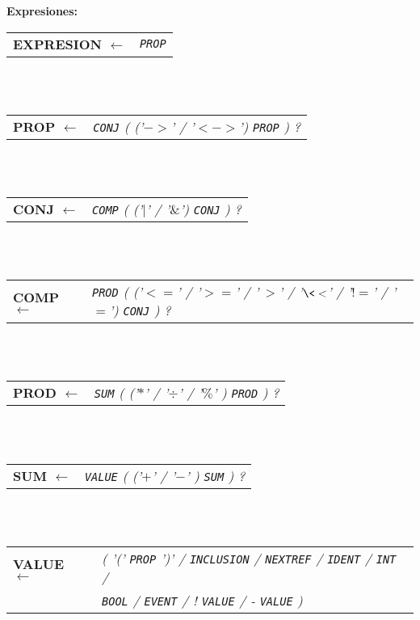 \documentclass[titlepage, 12pt]{book}
\begin{document}
\textbf{Expresiones:}\\

\noindent \begin{tabular}{>{\bfseries}l>{\itshape}l}
EXPRESION $\longleftarrow$ & \verb|PROP|
\end{tabular}
~\\\\
\begin{tabular}{>{\bfseries}l>{\itshape}l}
PROP $\longleftarrow$ & \verb|CONJ| ( ('$->$' / '$<->$') \verb|PROP| ) ?
\end{tabular}
~\\\\
\begin{tabular}{>{\bfseries}l>{\itshape}l}
CONJ $\longleftarrow$ & \verb|COMP| ( ('$|$' / '$\&$') \verb|CONJ| ) ?
\end{tabular}
~\\\\
\begin{tabular}{>{\bfseries}l>{\itshape}l}
COMP $\longleftarrow$ & \verb|PROD| ( ('$<=$' / '$>=$' / '$\>>$' / '$\<<$' / '$!=$' / '$=$') \verb|CONJ| ) ?
\end{tabular}
~\\\\
\begin{tabular}{>{\bfseries}l>{\itshape}l}
PROD $\longleftarrow$ & \verb|SUM| ( ('$*$' / '$\div$' / '$\%$' ) \verb|PROD| ) ?
\end{tabular}
~\\\\
\begin{tabular}{>{\bfseries}l>{\itshape}l}
SUM $\longleftarrow$ & \verb|VALUE| ( ('$+$' / '$-$' ) \verb|SUM| ) ?
\end{tabular}
~\\\\
\begin{tabular}{>{\bfseries}l>{\itshape}l}
VALUE $\longleftarrow$  & ( '(' \verb|PROP| ')' / \verb|INCLUSION| / \verb|NEXTREF| / \verb|IDENT| / \verb|INT| /\\
						&  \verb|BOOL| / \verb|EVENT| / ! \verb|VALUE| / - \verb|VALUE| ) \\
\end{tabular}
\end{document}
